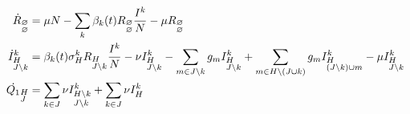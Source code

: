 \begin{footnotesize}
  \begin{align}
    \label{eq:fullQferg}
    \dot{R}_{\begin{subarray}{l}\varnothing \\
        \varnothing \end{subarray}} &= \mu N -\sum_k \beta_k(t) R_{\begin{subarray}{l}\varnothing \\ \varnothing \end{subarray}} \frac{I^k}{N} - \mu R_{\begin{subarray}{l}\varnothing \\ \varnothing \end{subarray}}\\
    \dot{I}^k_{\begin{subarray}{l}H\\ J \setminus k \end{subarray}} &=
    \beta_k(t) \sigma^k_{H} R_{\begin{subarray}{l}H \\ J\setminus
        k \end{subarray}} \frac{I^k}{N} -\nu I^k_{\begin{subarray}{l}H
        \\ J \setminus k \end{subarray}} -\sum_{m \in J \setminus k}
    g_m I^k_{\begin{subarray}{l}H \\ J \setminus k \end{subarray}} +
    \sum_{m \in H \setminus (J \cup k)} g_m
    I^k_{\begin{subarray}{l}H \\ (J \setminus k) \cup
        m \end{subarray}}
    -\mu I^k_{\begin{subarray}{l}H \\ J \setminus k \end{subarray}} \notag \\
    \dot{{Q_1}}_{\begin{subarray}{l}H\\ J \end{subarray}} &= \sum_{k \in
      J} \nu I^k_{\begin{subarray}{l}H \setminus k \\ J \setminus
        k \end{subarray}} +\sum_{k \in J} \nu I^k_{\begin{subarray}{l}H \\

\end{subarray}}
\end{align}
\end{footnotesize}
